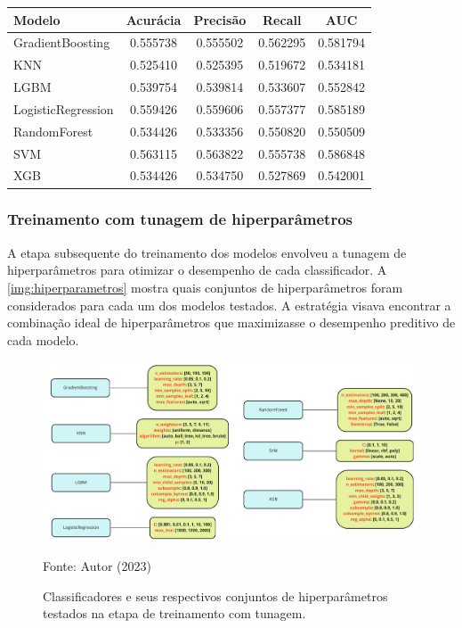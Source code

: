 \begin{table}[H]
	{
		\begin{tabular}{lcccc}
			\toprule
			\textbf{Modelo} & \textbf{Acurácia} & \textbf{Precisão} & \textbf{Recall} & \textbf{AUC} \\
			\midrule \midrule
			GradientBoosting & 0.555738 & 0.555502 & 0.562295 & 0.581794 \\
			\midrule
			KNN & 0.525410 & 0.525395 & 0.519672 & 0.534181 \\
			\midrule
			LGBM & 0.539754 & 0.539814 & 0.533607 & 0.552842 \\
			\midrule
			LogisticRegression & 0.559426 & 0.559606 & 0.557377 & 0.585189 \\
			\midrule
			RandomForest & 0.534426 & 0.533356 & 0.550820 & 0.550509 \\
			\midrule
			SVM & 0.563115 & 0.563822 & 0.555738 & 0.586848 \\
			\midrule
			XGB & 0.534426 & 0.534750 & 0.527869 & 0.542001 \\
			\bottomrule
		\end{tabular}
	}
	{
	}
\end{table}

\subsubsection{Treinamento com tunagem de hiperparâmetros}

A etapa subsequente do treinamento dos modelos envolveu a tunagem de hiperparâmetros para otimizar o desempenho de cada classificador. A \autoref{img:hiperparametros} mostra quais conjuntos de hiperparâmetros foram considerados para cada um dos modelos testados. A estratégia visava encontrar a combinação ideal de hiperparâmetros que maximizasse o desempenho preditivo de cada modelo.

\begin{figure}[H]
	\centering
	\caption{\label{img:hiperparametros}Classificadores e seus respectivos conjuntos de hiperparâmetros testados na etapa de treinamento com tunagem.}
	\includegraphics[scale=0.7]{USPSC-img/hiperparametros.pdf}
	\begin{center}
		Fonte: Autor (2023)
	\end{center}
\end{figure}

